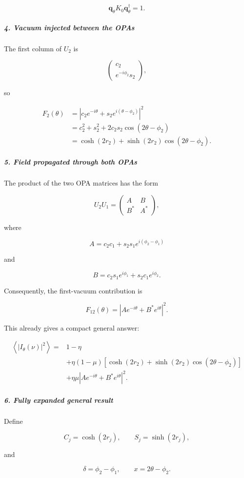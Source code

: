 \[
\mathbf q_\theta K_0\mathbf q_\theta^\dagger=1.
\]

\subparagraph*{4. Vacuum injected between the OPAs}

The first column of $U_2$ is

\[
\begin{pmatrix}
c_2\\
e^{-i\phi_2}s_2
\end{pmatrix},
\]

so

\[
\begin{aligned}
F_2(\theta)
&=
\left|
c_2e^{-i\theta}
+s_2e^{i(\theta-\phi_2)}
\right|^2\\
&=c_2^2+s_2^2+2c_2s_2\cos(2\theta-\phi_2)\\
&=\cosh(2r_2)+\sinh(2r_2)\cos(2\theta-\phi_2).
\end{aligned}
\]

\subparagraph*{5. Field propagated through both OPAs}

The product of the two OPA matrices has the form

\[
U_2U_1=
\begin{pmatrix}
A&B\\
B^*&A^*
\end{pmatrix},
\]

where

\[
A=c_2c_1+s_2s_1e^{i(\phi_2-\phi_1)}
\]

and

\[
B=c_2s_1e^{i\phi_1}+s_2c_1e^{i\phi_2}.
\]

Consequently, the first-vacuum contribution is

\[
F_{12}(\theta) = \left| Ae^{-i\theta}+B^*e^{i\theta} \right|^2.
\]

This already gives a compact general answer:

\[
{
\begin{aligned}
\left\langle |I_\theta(\nu)|^2\right\rangle
={}&1-\eta\\
&+\eta(1-\mu)
\left[
\cosh(2r_2)
+\sinh(2r_2)\cos(2\theta-\phi_2)
\right]\\
&+\eta\mu
\left|
Ae^{-i\theta}+B^*e^{i\theta}
\right|^2.
\end{aligned}
}
\]

\subparagraph*{6. Fully expanded general result}

Define

\[
C_j=\cosh(2r_j),\qquad S_j=\sinh(2r_j),
\]

and

\[
\delta=\phi_2-\phi_1,\qquad x=2\theta-\phi_2.
\]

